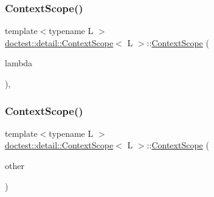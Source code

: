 \subsubsection{\texorpdfstring{Context\+Scope()}{ContextScope()}\hspace{0.1cm}{\footnotesize\ttfamily [1/2]}}
{\footnotesize\ttfamily template$<$typename L $>$ \\
\hyperlink{classdoctest_1_1detail_1_1_context_scope}{doctest\+::detail\+::\+Context\+Scope}$<$ L $>$\+::\hyperlink{classdoctest_1_1detail_1_1_context_scope}{Context\+Scope} (\begin{DoxyParamCaption}\item[{const L \&}]{lambda }\end{DoxyParamCaption})\hspace{0.3cm}{\ttfamily [inline]}, {\ttfamily [explicit]}}

\mbox{\label{classdoctest_1_1detail_1_1_context_scope_afca3228fdeb0e86257a21f826c4247ff}} 
\subsubsection{\texorpdfstring{Context\+Scope()}{ContextScope()}\hspace{0.1cm}{\footnotesize\ttfamily [2/2]}}
{\footnotesize\ttfamily template$<$typename L $>$ \\
\hyperlink{classdoctest_1_1detail_1_1_context_scope}{doctest\+::detail\+::\+Context\+Scope}$<$ L $>$\+::\hyperlink{classdoctest_1_1detail_1_1_context_scope}{Context\+Scope} (\begin{DoxyParamCaption}\item[{\hyperlink{classdoctest_1_1detail_1_1_context_scope}{Context\+Scope}$<$ L $>$ \&\&}]{other }\end{DoxyParamCaption})\hspace{0.3cm}{\ttfamily [inline]}}

\mbox{\label{classdoctest_1_1detail_1_1_context_scope_a1ee7d4702398ee8d0e80ab843aa260d7}} 
